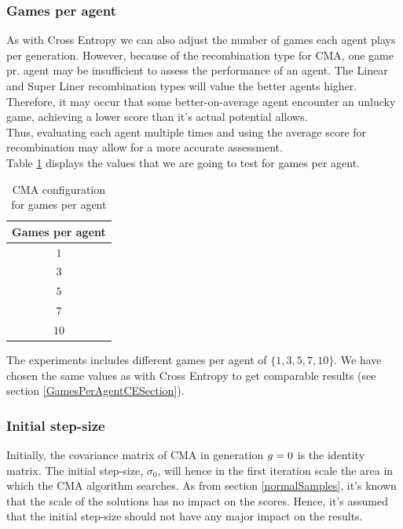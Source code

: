 \subsubsection{Games per agent \label{CMAGamesPerAgentSection}}
As with Cross Entropy we can also adjust the number of games each agent plays per generation.
However, because of the recombination type for CMA, one game pr. agent may  be insufficient to assess the
performance of an agent. The Linear and Super Liner recombination types will value the better agents higher.
Therefore, it may occur that some better-on-average agent encounter an unlucky game, achieving a lower score than
it's actual potential allows. \\
Thus, evaluating each agent multiple times and using the average score for recombination may allow for a more accurate assessment.\\
Table \ref{CMAGamesPerAgent} displays the values that we are going
to test for games per agent.

\begin{table}[h]
\centering
\begin{tabular}{c}
Games per agent\\
\hline
$1$\\
$3$\\
$5$\\
$7$\\
$10$
\end{tabular}
\caption{CMA configuration for games per agent \label{CMAGamesPerAgent}}
\end{table}

The experiments includes different games per agent of $\{1,3,5,7,10\}$. We have chosen the same 
values as with Cross Entropy to get comparable results (see section \ref{GamesPerAgentCESection}).

\subsubsection{Initial step-size}
Initially, the covariance matrix of CMA in generation $g = 0$
is the identity matrix. The initial step-size, $\sigma_0$, will hence in 
the first iteration scale the area in which the CMA algorithm searches.
As from section \ref{normalSamples}, it's known that the scale of the 
solutions has no impact on the scores. Hence, it's assumed that the initial 
step-size should not have any major impact on the results.

